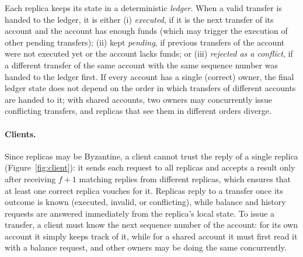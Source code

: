 \documentclass[sigconf,a4paper]{acmart}
\begin{document}
    Each replica keeps its state in a deterministic \emph{ledger}. When a valid
    transfer is handed to the ledger, it is either (i) \emph{executed}, if it is
    the next transfer of its account and the account has enough funds (which may
    trigger the execution of other pending transfers); (ii) kept \emph{pending},
    if previous transfers of the account were not executed yet or the account
    lacks funds; or (iii) \emph{rejected as a conflict}, if a different transfer of
    the same account with the same sequence number was handed to the ledger first.
    If every account has a single (correct) owner, the final ledger state does not
    depend on the order in which transfers of different accounts are handed to it;
    with shared accounts, two owners may concurrently issue conflicting transfers,
    and replicas that see them in different orders diverge.

    \paragraph{Clients.} Since replicas may be Byzantine, a client cannot trust the
    reply of a single replica (Figure~\ref{fig:client}): it sends each request to
    all replicas and accepts a result only after receiving $f+1$ matching replies
    from different replicas, which ensures that at least one correct replica
    vouches for it. Replicas reply to a transfer once its outcome is known
    (executed, invalid, or conflicting), while balance and history requests are
    answered immediately from the replica's local state. To issue a transfer, a
    client must know the next sequence number of the account: for its own account
    it simply keeps track of it, while for a shared account it must first read it
    with a balance request, and other owners may be doing the same concurrently.
\end{document}

